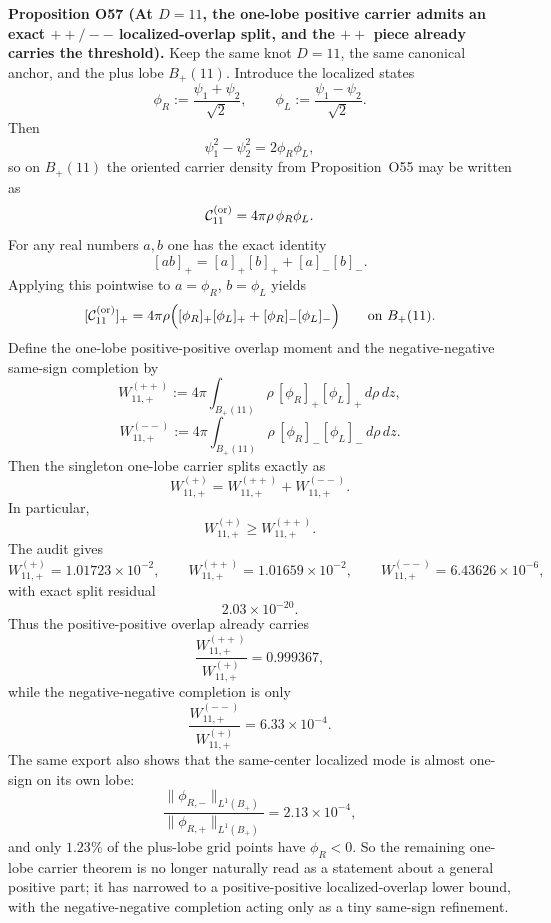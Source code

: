 \documentclass[aps,prd,onecolumn,notitlepage,nofootinbib,superscriptaddress,11pt,floatfix]{revtex4-2}
\begin{document}
\medskip\noindent\textbf{Proposition O57 (At \(D=11\), the one-lobe positive carrier admits an exact \(++/--\) localized-overlap split, and the \(++\) piece already carries the threshold).}
Keep the same knot \(D=11\), the same canonical anchor, and the plus lobe \(B_+(11)\).  Introduce the localized states
\[
\phi_R:=\frac{\psi_1+\psi_2}{\sqrt2},
\qquad
\phi_L:=\frac{\psi_1-\psi_2}{\sqrt2}.
\]
Then
\[
\psi_1^2-\psi_2^2=2\phi_R\phi_L,
\]
so on \(B_+(11)\) the oriented carrier density from Proposition~O55 may be written as
\[
\mathcal C_{11}^{\rm(or)} = 4\pi\rho\,\phi_R\phi_L.
\]
For any real numbers \(a,b\) one has the exact identity
\[
[ab]_+ = [a]_+[b]_+ + [a]_- [b]_-.
\]
Applying this pointwise to \(a=\phi_R\), \(b=\phi_L\) yields
\[
[\mathcal C_{11}^{\rm(or)}]_+
=
4\pi\rho\Bigl([\phi_R]_+[\phi_L]_+ + [\phi_R]_- [\phi_L]_-\Bigr)
\qquad\text{on }B_+(11).
\]
Define the one-lobe positive-positive overlap moment and the negative-negative same-sign completion by
\[
W_{11,+}^{(++)}
:=
4\pi \int_{B_+(11)} \rho\,[\phi_R]_+[\phi_L]_+\,d\rho\,dz,
\]
\[
W_{11,+}^{(--)}
:=
4\pi \int_{B_+(11)} \rho\,[\phi_R]_- [\phi_L]_-\,d\rho\,dz.
\]
Then the singleton one-lobe carrier splits exactly as
\[
W_{11,+}^{(+)}
=
W_{11,+}^{(++)}+W_{11,+}^{(--)}.
\]
In particular,
\[
W_{11,+}^{(+)}\ge W_{11,+}^{(++)}.
\]
The audit
gives
\[
W_{11,+}^{(+)}=1.01723\times10^{-2},
\qquad
W_{11,+}^{(++)}=1.01659\times10^{-2},
\qquad
W_{11,+}^{(--)}=6.43626\times10^{-6},
\]
with exact split residual
\[
2.03\times10^{-20}.
\]
Thus the positive-positive overlap already carries
\[
\frac{W_{11,+}^{(++)}}{W_{11,+}^{(+)}}
=
0.999367,
\]
while the negative-negative completion is only
\[
\frac{W_{11,+}^{(--)}}{W_{11,+}^{(+)}}
=
6.33\times10^{-4}.
\]
The same export also shows that the same-center localized mode is almost one-sign on its own lobe:
\[
\frac{\|\phi_{R,-}\|_{L^1(B_+)}}{\|\phi_{R,+}\|_{L^1(B_+)}} = 2.13\times10^{-4},
\]
and only \(1.23\%\) of the plus-lobe grid points have \(\phi_R<0\).  So the remaining one-lobe carrier theorem is no longer naturally read as a statement about a general positive part; it has narrowed to a positive-positive localized-overlap lower bound, with the negative-negative completion acting only as a tiny same-sign refinement.
\end{document}
